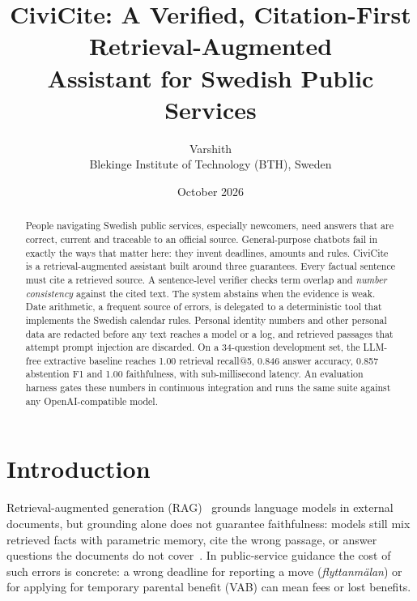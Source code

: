 \documentclass[11pt,a4paper]{article}
\title{\textbf{CiviCite}: A Verified, Citation-First Retrieval-Augmented\\ Assistant for Swedish Public Services}
\author{Varshith\\ \small Blekinge Institute of Technology (BTH), Sweden}
\date{October 2026}
\begin{document}
\maketitle

\begin{abstract}
People navigating Swedish public services, especially newcomers, need answers that are correct, current and
traceable to an official source. General-purpose chatbots fail in exactly the ways that matter here: they
invent deadlines, amounts and rules. CiviCite is a retrieval-augmented assistant built around three guarantees.
Every factual sentence must cite a retrieved source. A sentence-level verifier checks term overlap and
\emph{number consistency} against the cited text. The system abstains when the evidence is weak.
Date arithmetic, a frequent source of errors, is delegated to a deterministic tool that implements the
Swedish calendar rules. Personal identity numbers and other personal data are redacted before any text
reaches a model or a log, and retrieved passages that attempt prompt injection are discarded. On a
34-question development set, the LLM-free extractive baseline reaches 1.00 retrieval recall@5,
0.846 answer accuracy, 0.857 abstention F1 and 1.00 faithfulness, with sub-millisecond latency. An
evaluation harness gates these numbers in continuous integration and runs the same suite against any
OpenAI-compatible model.
\end{abstract}

\section{Introduction}
Retrieval-augmented generation (RAG)~\cite{lewis} grounds language models in external documents, but
grounding alone does not guarantee faithfulness: models still mix retrieved facts with parametric memory,
cite the wrong passage, or answer questions the documents do not cover~\cite{alce,ragas}. In public-service
guidance the cost of such errors is concrete: a wrong deadline for reporting a move (\emph{flyttanmälan})
or for applying for temporary parental benefit (VAB) can mean fees or lost benefits.
\end{document}
